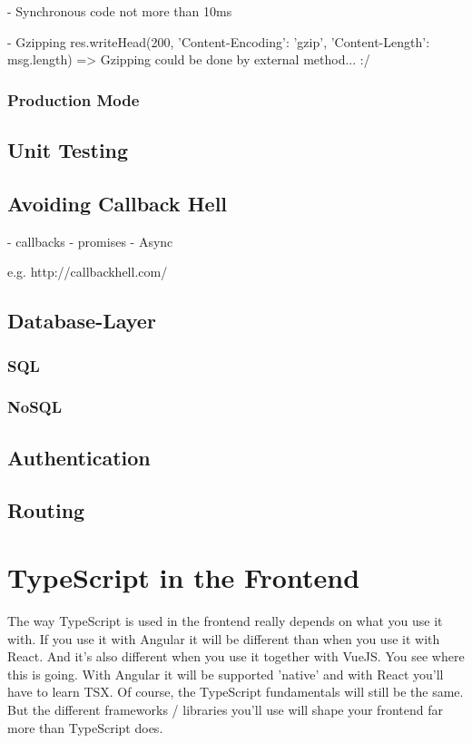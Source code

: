 \documentclass[12pt,a4paper]{report}
\begin{document}
- Synchronous code not more than 10ms

- Gzipping res.writeHead(200, {'Content-Encoding': 'gzip', 'Content-Length': msg.length}) => Gzipping could be done by external method... :/

\subsection{Production Mode}

\section{Unit Testing}

\section{Avoiding Callback Hell}

- callbacks
- promises
- Async

e.g. http://callbackhell.com/



\section{Database-Layer}

\subsection{SQL}

\subsection{NoSQL}

\section{Authentication}

\section{Routing}


\chapter{TypeScript in the Frontend}

The way TypeScript is used in the frontend really depends on what you use it with. If you use it with Angular it will be different than when you use it with React. And it's also different when you use it together with VueJS. You see where this is going. With Angular it will be supported 'native' and with React you'll have to learn TSX. Of course, the TypeScript fundamentals will still be the same. But the different frameworks / libraries you'll use will shape your frontend far more than TypeScript does.
\end{document}
